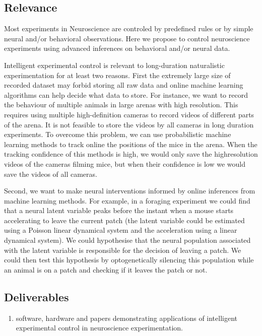 
\subsection{Relevance}

Most experiments in Neuroscience are controled by predefined rules or by simple
neural and/or behavioral observations. Here we propose to control neuroscience
experiments using advanced inferences on behavioral and/or neural data.

Intelligent experimental control is relevant to long-duration naturalistic
experimentation for at least two reasons. First the extremely large size of
recorded dataset may forbid storing all raw data and online machine learning
algorithms can help decide what data to store. For instance, we want to record
the behaviour of multiple animals in large arenas with high resolution. This
requires using multiple high-definition cameras to record videos of different
parts of the arena. It is not feasible to store the videos by all cameras in
long duration experiments. To overcome this problem, we can use probabilistic
machine learning methods to track online the positions of the mice in the
arena. When the tracking confidence of this methods is high, we would only save
the highresolution videos of the cameras filming mice, but when their
confidence is low we would save the videos of all cameras.

Second, we want to make neural interventions informed by online inferences from
machine learning methods. For example, in a foraging experiment we could find
that a neural latent variable peaks before the instant when a mouse starts
accelerating to leave the current patch (the latent variable could be estimated
using a Poisson linear dynamical system and the acceleration using a linear
dynamical system). We could hypothesise that the neural population associated
with the latent variable is responsible for the decision of leaving a patch.
We could then test this hypothesis by optogenetically silencing this population
while an animal is on a patch and checking if it leaves the patch or not.

\subsection{Deliverables}

\begin{enumerate}

    \item software, hardware and papers demonstrating applications of
        intelligent experimental control in neuroscience experimentation.

\end{enumerate}

